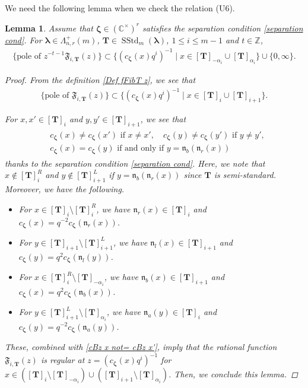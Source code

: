\documentclass[12pt]{amsart}
\newtheorem{lem}[thm]{Lemma}
\numberwithin{equation}{thm}
\newcommand\CC{\mathbb C}
\newcommand\ZZ{\mathbb Z}
\newcommand\bT{\mathbf T}
\newcommand\fF{\mathfrak F}
\newcommand\fn{\mathfrak n}
\renewcommand\a{\alpha}  %
\newcommand\vL{\varLambda}
\newcommand\Bz{\boldsymbol\zeta}
\newcommand\Bla{\boldsymbol\lambda}
\newcommand{\SStd}{\operatorname{SStd}}
\newcounter{ni}
\begin{document}
We need the following lemma when we check the relation (U6). 
\begin{lem} 
\label{Lemma pole z-t-1 fFibTz} 
Assume that $\Bz \in (\CC^{\times})^r$ satisfies the separation condition \eqref{separation cond}. 
For $\Bla \in \vL_{n,r}^+(m)$, $\bT \in \SStd_m(\Bla)$, $1 \leq i \leq m-1$ and $t \in \ZZ$, 
\begin{align*}
\{\text{pole of }z^{-t-1} \fF_{i,\bT} (z)\} 
	\subset \{ (c_{\Bz}(x) q^i)^{-1} \mid x \in [\bT]_{-\a_i} \cup [\bT]_{\a_i}\} \cup \{0, \infty\}.
\end{align*}
\begin{proof} 
From the definition \eqref{Def fFibT z}, we see that 
\begin{align*}
\{ \text{pole of }  \fF_{i,\bT} (z) \} \subset \{ (c_{\Bz} (x) q^i)^{-1} \mid x \in [\bT]_i \cup [\bT]_{i+1}\}. 
\end{align*}

For $x,x' \in [\bT]_i$ and $y,y' \in [\bT]_{i+1}$, we see that 
\begin{align}
\label{cBz x not= cBz x'}
\begin{split}
&c_{\Bz} (x) \not= c_{\Bz} (x') \text{ if } x \not=x', 
\quad 
c_{\Bz} (y) \not= c_{\Bz} (y') \text{ if } y \not=y', 
\\
& c_{\Bz} (x) = c_{\Bz} (y) \text{ if and only if } y = \fn_b (\fn_r(x)) 
\end{split}
\end{align}
thanks to the separation condition \eqref{separation cond}.  
Here, we note that $x \not\in [\bT]_i^R$ and $y \not\in [\bT]_{i+1}^L$ if $y= \fn_b(\fn_r(x))$ 
since $\bT$ is semi-standard. 
Moreover, we have the following. 
\begin{itemize} 
\item 
For $x \in [\bT]_i \setminus [\bT]_i^R$, we have 
$\fn_r(x) \in [\bT]_i$ and $c_{\Bz} (x) = q^{-2} c_{\Bz} (\fn_r(x))$. 
 
\item 
For $y \in [\bT]_{i+1} \setminus [\bT]_{i+1}^L$, we have  
$\fn_l(x) \in [\bT]_{i+1}$ and $c_{\Bz} (y) = q^2 c_{\Bz} (\fn_l(y))$.  

\item 
For $x \in [\bT]_i^R \setminus [\bT]_{-\a_i}$, we have  
$\fn_b(x) \in [\bT]_{i+1}$ and $c_{\Bz} (x) = q^2 c_{\Bz} (\fn_b(x))$. 

\item 
For $y \in [\bT]_{i+1}^L \setminus [\bT]_{\a_i}$, 
we have $\fn_a(y) \in [\bT]_i$ and $c_{\Bz} (y) = q^{-2} c_{\Bz}(\fn_a(y))$. 
\end{itemize} 
These, combined with \eqref{cBz x not= cBz x'}, imply that 
the rational function $ \fF_{i, \bT}(z)$  is regular at $z= (c_{\Bz}(x) q^i)^{-1}$  
for $x \in ([\bT]_i \setminus [\bT]_{-\a_i}) \cup ([\bT]_{i+1} \setminus [\bT]_{\a_i})$. 
Then, we conclude this lemma. 
\end{proof}
\end{lem} 
\end{document}
